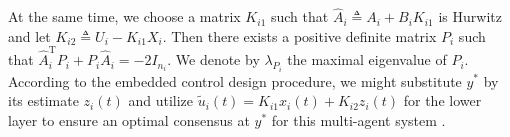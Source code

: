 \documentclass[sort&compress]{IEEEtran}
\renewcommand{\top}{{\mathrm{T}}}
\newcommand{\lm}{\lambda}
\begin{document}

At the same time, we choose a matrix $K_{i1}$ such that $\hat A_i\triangleq A_i+B_iK_{i1}$ is Hurwitz and let $K_{i2}\triangleq U_i-K_{i1} X_i$. Then there exists a positive definite matrix $P_i$ such that $\hat A_i^\top P_i+P_i\hat A_i=-2I_{n_i}$. We denote by $\lm_{P_i}$ the maximal eigenvalue of $P_i$. %
According to the embedded control design procedure, we might substitute $y^*$ by its estimate $z_i(t)$ and utilize $\tilde u_i(t)=K_{i1} x_i(t)+K_{i2} z_i(t)$ for the lower layer to ensure an optimal consensus at $y^*$ for this multi-agent system \cite{tang2019optimal, tang2021optimal}.  
\end{document}
